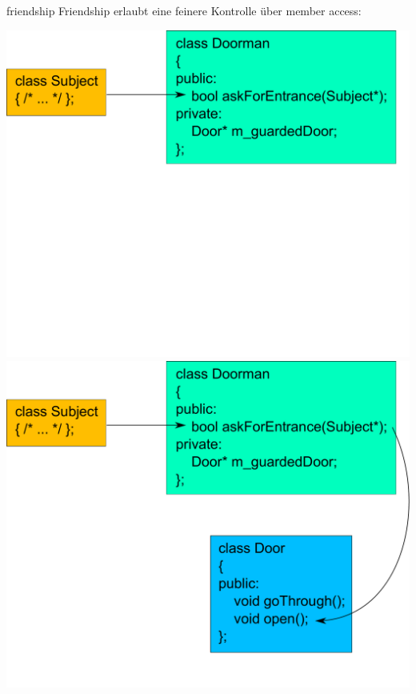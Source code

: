 \begin{frame}{friendship}
	Friendship erlaubt eine feinere Kontrolle über member access:
	
	\vspace{1em}
	
	\onslide*<+> { \includegraphics[height=0.75\textheight]{images/without-friendship-0} }
	\onslide*<+> { \includegraphics[height=0.75\textheight]{images/without-friendship-1} }

\end{frame}
